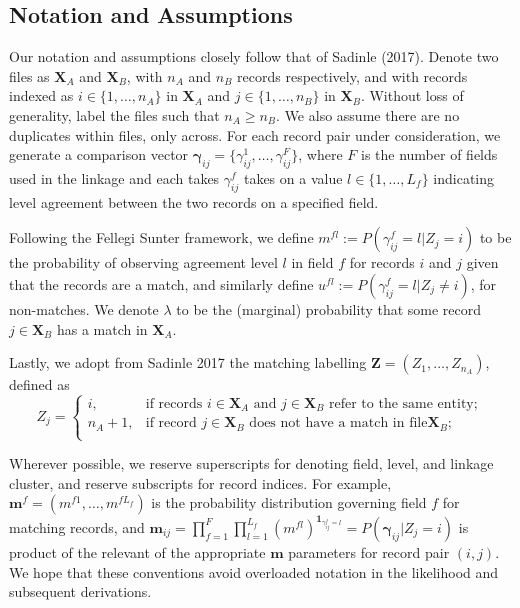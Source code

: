 \documentclass[
  12pt,
]{article}
\begin{document}
\hypertarget{notation-and-assumptions}{%
\subsection{Notation and Assumptions}\label{notation-and-assumptions}}

Our notation and assumptions closely follow that of Sadinle (2017).
Denote two files as \(\mathbf{X}_A\) and \(\mathbf{X}_B\), with \(n_A\)
and \(n_B\) records respectively, and with records indexed as
\(i \in \{1, \ldots, n_A\}\) in \(\mathbf{X}_A\) and
\(j \in \{1, \ldots, n_B\}\) in \(\mathbf{X}_B\). Without loss of
generality, label the files such that \(n_A \geq n_B\). We also assume
there are no duplicates within files, only across. For each record pair
under consideration, we generate a comparison vector
\(\boldsymbol{\gamma}_{ij} = \{\gamma_{ij}^1, \ldots, \gamma_{ij}^F\}\),
where \(F\) is the number of fields used in the linkage and each takes
\(\gamma_{ij}^f\) takes on a value \(l \in \{1, \ldots, L_f\}\)
indicating level agreement between the two records on a specified field.

Following the Fellegi Sunter framework, we define
\(m^{fl}:= P(\gamma_{ij}^f = l |Z_j = i)\) to be the probability of
observing agreement level \(l\) in field \(f\) for records \(i\) and
\(j\) given that the records are a match, and similarly define
\(u^{fl}:= P(\gamma_{ij}^f = l |Z_j \neq i)\), for non-matches. We
denote \(\lambda\) to be the (marginal) probability that some record
\(j \in \mathbf{X}_B\) has a match in \(\mathbf{X}_A\).

Lastly, we adopt from Sadinle 2017 the matching labelling
\(\mathbf{Z} = (Z_1, \ldots, Z_{n_A})\), defined as \[Z_j=\begin{cases} 
    i,  & \text{if records } i\in \mathbf{X}_A \text{ and } j\in \mathbf{X}_B \text{ refer to the same entity}; \\
    n_A + 1,  & \text{if record } j\in \mathbf{X}_B \text{ does not have a match in file} \mathbf{X}_B; \\
\end{cases}\]

Wherever possible, we reserve superscripts for denoting field, level,
and linkage cluster, and reserve subscripts for record indices. For
example, \(\mathbf{m}^f = (m^{f1}, \ldots, m^{fL_f})\) is the
probability distribution governing field \(f\) for matching records, and
\(\mathbf{m}_{ij}= \prod_{f=1}^{F}\prod_{l=1}^{L_f} \left(m^{fl}\right)^{\mathbf{1}_{\gamma_{ij}^f = l}} = P(\boldsymbol{\gamma}_{ij}|Z_j = i)\)
is product of the relevant of the appropriate \(\mathbf{m}\) parameters
for record pair \((i,j)\). We hope that these conventions avoid
overloaded notation in the likelihood and subsequent derivations.
\end{document}
